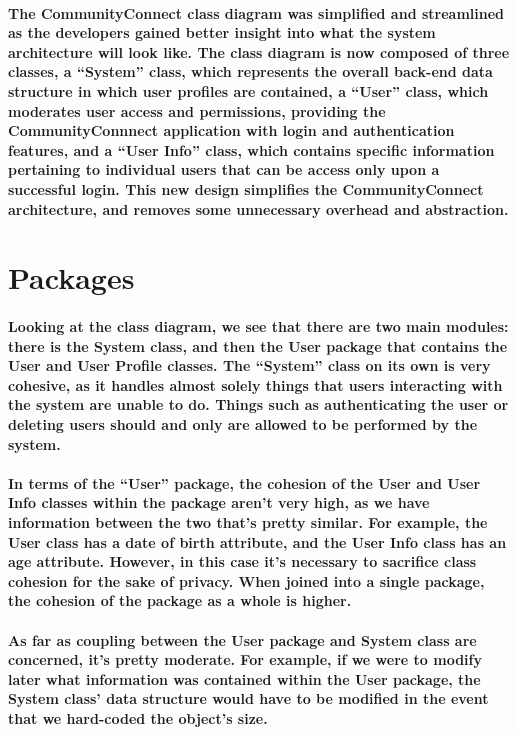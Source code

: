 \documentclass[12pt]{article}
\begin{document}
  \paragraph{\normalfont \indent The CommunityConnect class diagram was simplified and streamlined as the developers gained better insight into what the system architecture will look like. The class diagram is now composed of three classes, a “System” class, which represents the overall back-end data structure in which user profiles are contained, a “User” class, which moderates user access and permissions, providing the CommunityConnnect application with login and authentication features, and a “User Info” class, which contains specific information pertaining to individual users that can be access only upon a successful login. This new design simplifies the CommunityConnect architecture, and removes some unnecessary overhead and abstraction.
  }

\section{\bf Packages}
  \paragraph{\normalfont \indent Looking at the class diagram, we see that there are two main modules: there is the System class, and then the User package that contains the User and User Profile classes. The “System” class on its own is very cohesive, as it handles almost solely things that users interacting with the system are unable to do. Things such as authenticating the user or deleting users should and only are allowed to be performed by the system.
  }
  \paragraph{\normalfont \indent In terms of the “User” package, the cohesion of the User and User Info classes within the package aren’t very high, as we have information between the two that’s pretty similar. For example, the User class has a date of birth attribute, and the User Info class has an age attribute. However, in this case it’s necessary to sacrifice class cohesion for the sake of privacy. When joined into a single package, the cohesion of the package as a whole is higher.
  }
  \paragraph{\normalfont \indent As far as coupling between the User package and System class are concerned, it’s pretty moderate. For example, if we were to modify later what information was contained within the User package, the System class’ data structure would have to be modified in the event that we hard-coded the object’s size.
  }
\end{document}
